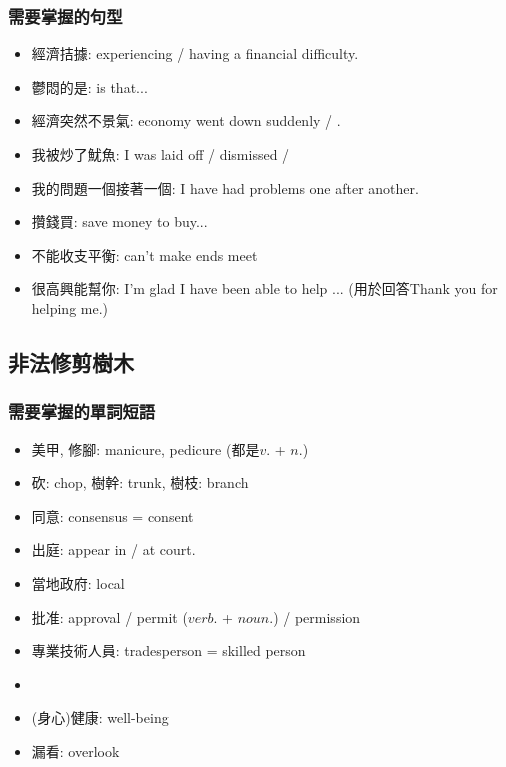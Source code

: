 \subsubsection*{需要掌握的句型}
\begin{itemize}
  \itemsep0em
  \item 經濟拮據: experiencing / having a financial difficulty.
  \item 鬱悶的是:  is that...
  \item 經濟突然不景氣: economy went down suddenly / .
  \item 我被炒了魷魚: I was laid off / dismissed / 
  \item 我的問題一個接著一個: I have had problems one after another.
  \item 攢錢買: save money to buy...
  \item 不能收支平衡: can't make ends meet
  \item 很高興能幫你: I'm glad I have been able to help ... (用於回答Thank you for helping me.)
\end{itemize}

\subsection{非法修剪樹木}
\subsubsection*{需要掌握的單詞短語}
\begin{itemize}
  \itemsep0em
  \item 美甲, 修腳: manicure, pedicure (都是$v.$ + $n.$)
  \item 砍: chop, 樹幹: trunk, 樹枝: branch
  \item 同意: consensus = consent
  \item 出庭: appear in / at court.
  \item 當地政府: local 
  \item 批准: approval / permit ($verb.$ + $noun.$) / permission
  \item 專業技術人員: tradesperson = skilled person
  \item {}
  \item (身心)健康: well-being
  \item 漏看: overlook
\end{itemize}

